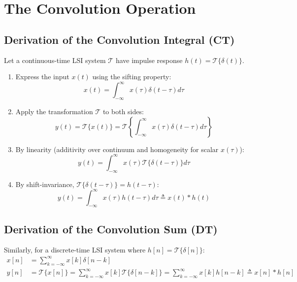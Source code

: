\documentclass[12pt,a4paper]{article}
\begin{document}
\section{The Convolution Operation}

\subsection{Derivation of the Convolution Integral (CT)}
Let a continuous-time LSI system $\mathcal{T}$ have impulse response $h(t) = \mathcal{T}\{\delta(t)\}$.
\begin{enumerate}[topsep=2pt, itemsep=2pt]
  \item Express the input $x(t)$ using the sifting property:
  \begin{equation}
    x(t) = \int_{-\infty}^{\infty} x(\tau) \delta(t - \tau) d\tau
  \end{equation}
  \item Apply the transformation $\mathcal{T}$ to both sides:
  \begin{equation}
    y(t) = \mathcal{T}\{x(t)\} = \mathcal{T}\left\{ \int_{-\infty}^{\infty} x(\tau) \delta(t - \tau) d\tau \right\}
  \end{equation}
  \item By linearity (additivity over continuum and homogeneity for scalar $x(\tau)$):
  \begin{equation}
    y(t) = \int_{-\infty}^{\infty} x(\tau) \mathcal{T}\{\delta(t - \tau)\} d\tau
  \end{equation}
  \item By shift-invariance, $\mathcal{T}\{\delta(t - \tau)\} = h(t - \tau)$:
  \begin{equation}
    y(t) = \int_{-\infty}^{\infty} x(\tau) h(t - \tau) d\tau \triangleq x(t) * h(t)
  \end{equation}
\end{enumerate}

\subsection{Derivation of the Convolution Sum (DT)}
Similarly, for a discrete-time LSI system where $h[n] = \mathcal{T}\{\delta[n]\}$:
\begin{align}
  x[n] &= \sum_{k=-\infty}^{\infty} x[k] \delta[n - k] \\
  y[n] &= \mathcal{T}\{x[n]\} = \sum_{k=-\infty}^{\infty} x[k] \mathcal{T}\{\delta[n - k]\} = \sum_{k=-\infty}^{\infty} x[k] h[n - k] \triangleq x[n] * h[n]
\end{align}
\end{document}
